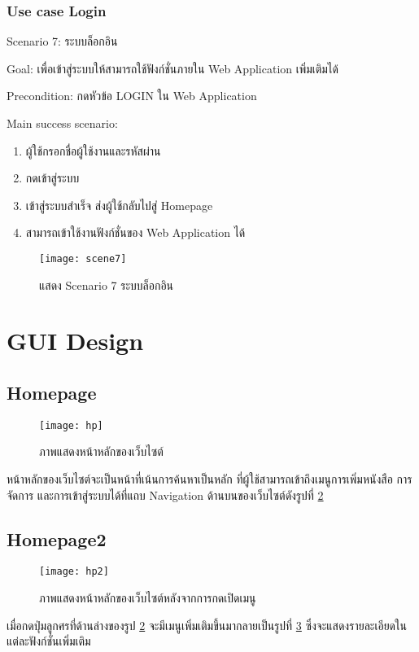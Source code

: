 \subsubsection{Use case Login}

Scenario 7: ระบบล็อกอิน

Goal: เพื่อเข้าสู่ระบบให้สามารถใช้ฟังก์ชั่นภายใน Web Application เพิ่มเติมได้

Precondition: กดหัวข้อ LOGIN ใน Web Application

Main success scenario:

\begin{enumerate}
    \item ผู้ใช้กรอกชื่อผู้ใช้งานและรหัสผ่าน
    \item กดเข้าสู่ระบบ
    \item เข้าสู่ระบบสำเร็จ ส่งผู้ใช้กลับไปสู่ Homepage
    \item สามารถเข้าใช้งานฟังก์ชั่นของ Web Application ได้
\end{enumerate}
\begin{figure}[H]
    \centering
    \texttt{[image: scene7]}
    \caption{แสดง Scenario 7 ระบบล็อกอิน}\label{fig:scene7}
\end{figure}

\section{GUI Design}

\subsection{Homepage}
\begin{figure}[H]
    \centering
    \texttt{[image: hp]}
    \caption{ภาพแสดงหน้าหลักของเว็บไซต์}\label{fig:hp}
\end{figure}
หน้าหลักของเว็บไซต์จะเป็นหน้าที่เน้นการค้นหาเป็นหลัก ที่ผู้ใช้สามารถเข้าถึงเมนูการเพิ่มหนังสือ การจัดการ และการเข้าสู่ระบบได้ที่แถบ Navigation ด้านบนของเว็บไซต์ดังรูปที่ \ref{fig:hp}

\subsection{Homepage2}
\begin{figure}[H]
    \centering
    \texttt{[image: hp2]}
    \caption{ภาพแสดงหน้าหลักของเว็บไซต์หลังจากการกดเปิดเมนู}\label{fig:hp2}
\end{figure}
เมื่อกดปุ่มลูกศรที่ด้านล่างของรูป \ref{fig:hp} จะมีเมนูเพิ่มเติมขึ้นมากลายเป็นรูปที่ \ref{fig:hp2} ซึ่งจะแสดงรายละเอียดในแต่ละฟังก์ชั่นเพิ่มเติม

